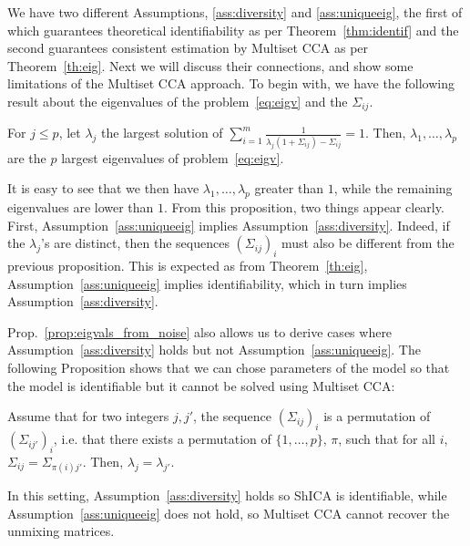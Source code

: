 We have two different Assumptions, \ref{ass:diversity} and \ref{ass:uniqueeig}, the first of which guarantees theoretical identifiability as per Theorem~\ref{thm:identif} and the second guarantees consistent estimation by Multiset CCA as per Theorem~\ref{th:eig}. Next we will discuss their connections, and show some limitations of the Multiset CCA approach. To begin with, we have the following result about the eigenvalues of the problem~\eqref{eq:eigv} and the $\Sigma_{ij}$.
\begin{proposition}
  \label{prop:eigvals_from_noise}
  For $j\leq p$, let $\lambda_j$ the largest solution of $ \sum_{i=1}^m\frac{1}{\lambda_j(1 + \Sigma_{ij}) -\Sigma_{ij}}=1$. Then, $\lambda_1, \dots, \lambda_p$ are the $p$ largest eigenvalues of problem~\eqref{eq:eigv}.
\end{proposition}
It is easy to see that we then have $\lambda_1, \dots, \lambda_p$ greater than $1$, while the remaining eigenvalues are lower than $1$.
From this proposition, two things appear clearly. First, Assumption~\ref{ass:uniqueeig} implies Assumption~\ref{ass:diversity}.
%
Indeed, if the $\lambda_j$'s are distinct, then the sequences $(\Sigma_{ij})_i$ must also be different from the previous proposition.
%
This is expected as from Theorem~\ref{th:eig}, Assumption~\ref{ass:uniqueeig} implies identifiability, which in turn implies Assumption~\ref{ass:diversity}.

Prop.~\ref{prop:eigvals_from_noise} also allows us to derive cases where Assumption~\ref{ass:diversity} holds but not Assumption~\ref{ass:uniqueeig}. The following Proposition shows that we can chose parameters of the model so that the model is identifiable but it cannot be solved using Multiset CCA:
\begin{proposition}
\label{counter}
Assume that for two integers $j, j'$, the sequence $(\Sigma_{ij})_i$ is a permutation of $(\Sigma_{ij'})_i$, i.e. that there exists a permutation of $\{1,\dots, p\}$, $\pi$, such that for all $i$, $\Sigma_{ij} = \Sigma_{\pi(i)j'}$.  Then, $\lambda_j = \lambda_{j'}$.
\end{proposition}
In this setting, Assumption~\ref{ass:diversity} holds so ShICA is identifiable, while Assumption~\ref{ass:uniqueeig} does not hold, so Multiset CCA cannot recover the unmixing matrices.




